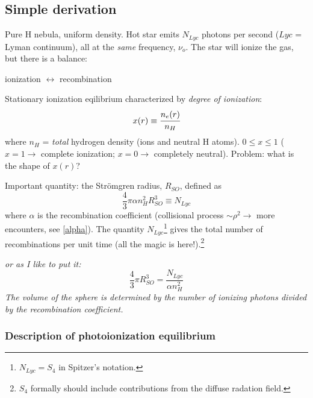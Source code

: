 \documentclass[11pt]{article}
\newcommand{\mar}[1]{\hspace{0pt}\marginpar{-\textcolor{black}{#1}-}}
\newcommand{\mynotes}[1]{{\fontfamily{cmss}\selectfont \textit{#1}}}
\begin{document}
\subsection{Simple derivation}
Pure H nebula, uniform density. Hot star emits $N_{Lyc}$ photons per
second ($Lyc$ = Lyman continuum), all at the \emph{same} frequency, $\nu_{o}$.
The star will ionize the gas, but there is a balance:
\begin{center}
    \vspace{-2ex}ionization $\longleftrightarrow$ recombination\vspace{-2ex}
\end{center}
Stationary ionization eqilibrium characterized by \textit{degree of ionization}:
\[
    x(r) \equiv \cfrac{n_{e}(r)}{n_{H}}
    \]
where $n_{H}$ = \emph{total}
hydrogen density (ions and neutral H atoms).
$0 \le x \le 1$ ($x = 1 \rightarrow$ complete ionization; $x = 0
\rightarrow$ completely neutral). Problem: what is the shape of $x(r)$?

Important quantity: the Str\"{o}mgren radius, $R_{SO}$, defined as
\[
    \frac{4}{3}\pi\alpha{n_{H}^{2}}{R_{SO}^{3}} \equiv N_{Lyc}
    \]
where $\alpha$ is the recombination coefficient
(collisional process $\sim\rho^{2} \rightarrow$ more encounters, see \ref{alpha}).
The quantity $N_{Lyc}$\footnote{$N_{Lyc} = S_{4}$ in Spitzer's notation.}
gives the total number of recombinations per unit
time (all the magic is here!).\footnote{$S_{4}$ formally should include
contributions from the diffuse radation field.}

\mynotes{or as I like to put it:
\[
    \frac{4}{3}\pi{R_{SO}^{3}} = \frac{ N_{Lyc}}{\alpha{n_{H}^{2}}}
    \]
The volume of the sphere is determined by the number of ionizing photons
divided by the recombination coefficient.}

\subsubsection{Description of photoionization equilibrium}
\mar{53}
\end{document}
